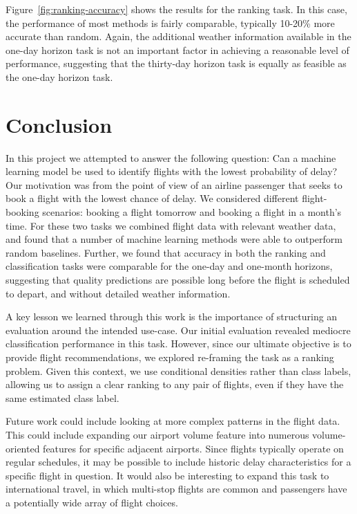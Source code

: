 \documentclass[twocolumn]{article}
\begin{document}
Figure~\ref{fig:ranking-accuracy} shows the results for the ranking task. In this case, the performance of most methods is fairly comparable, typically 10-20\% more accurate than random. Again, the additional weather information available in the one-day horizon task is not an important factor in achieving a reasonable level of performance, suggesting that the thirty-day horizon task is equally as feasible as the one-day horizon task.

\section{Conclusion}
In this project we attempted to answer the following question: Can a machine learning model be used to identify flights with the lowest probability of delay? 
Our motivation was from the point of view of an airline passenger that seeks to book a flight with the lowest chance of delay.
We considered different flight-booking scenarios: booking a flight tomorrow and booking a flight in a month's time.
For these two tasks we combined flight data with relevant weather data, and found that a number of machine learning methods were able to outperform random baselines. Further, we found that accuracy in both the ranking and classification tasks were comparable for the one-day and one-month horizons, suggesting that quality predictions are possible long before the flight is scheduled to depart, and without detailed weather information.


A key lesson we learned through this work is the importance of structuring an evaluation around the intended use-case. Our initial evaluation revealed mediocre classification performance in this task. However, since our ultimate objective is to provide flight recommendations, we explored re-framing the task as a ranking problem. Given this context, we use conditional densities rather than class labels, allowing us to assign a clear ranking to any pair of flights, even if they have the same estimated class label.


Future work could include looking at more complex patterns in the flight data. This could include expanding our airport volume feature into numerous volume-oriented features for specific adjacent airports. Since flights typically operate on regular schedules, it may be possible to include historic delay characteristics for a specific flight in question. It would also be interesting to expand this task to international travel, in which multi-stop flights are common and passengers have a potentially wide array of flight choices.



\end{document}
